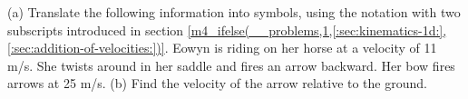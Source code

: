 (a) Translate the following information into symbols,
using the notation with two subscripts introduced
in section
\ref{m4_ifelse(__problems,1,[:sec:kinematics-1d:],[:sec:addition-of-velocities:])}.
Eowyn is riding on her horse at a velocity of 11 m/s.
She twists around in her saddle and fires an arrow backward.
Her bow fires arrows at 25 m/s. (b) Find the velocity of the
arrow relative to the ground.
